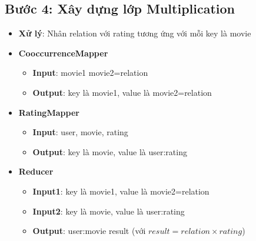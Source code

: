\documentclass{report}
\begin{document}
\subsection*{Bước 4: Xây dựng lớp Multiplication}
\begin{itemize}
    \item \textbf{Xử lý}: Nhân relation với rating tương ứng với mỗi key là movie
    \item \textbf{CooccurrenceMapper}
          \begin{itemize}
              \item \textbf{Input}: movie1 \quad movie2=relation \\
              \item \textbf{Output}: key là movie1, value là movie2=relation \\
          \end{itemize}
    \item \textbf{RatingMapper}
          \begin{itemize}
              \item \textbf{Input}: user, movie, rating \\
              \item \textbf{Output}: key là movie, value là user:rating \\
          \end{itemize}
    \item \textbf{Reducer}
          \begin{itemize}
              \item \textbf{Input1}: key là movie1, value là movie2=relation \\
              \item \textbf{Input2}: key là movie, value là user:rating \\
              \item \textbf{Output}: user:movie \quad result (với $result = relation \times rating$) \\
          \end{itemize}
\end{itemize}
\end{document}
